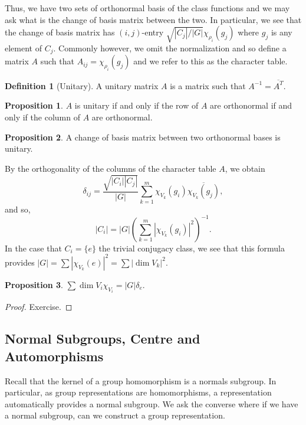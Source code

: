 \documentclass[]{article}
\theoremstyle{definition}
\theoremstyle{definition}
\newtheorem{definition}{Definition}[section]
\newtheorem{proposition}{Proposition}[section]
\begin{document}
Thus, we have two sets of orthonormal basis of the class functions and we may 
ask what is the change of basis matrix between the two. In particular, we 
see that the change of basis matrix has \((i, j)\)-entry 
\(\sqrt{|C_j| / |G|}\chi_{\rho_i}(g_j)\) where \(g_j\) is any element of 
\(C_j\). Commonly however, we omit the normalization and so define 
a matrix \(A\) such that \(A_{ij} = \chi_{\rho_i}(g_j)\) and we refer to this 
as the character table.

\begin{definition}[Unitary]
  A unitary matrix \(A\) is a matrix such that \(A^{-1} = \overline{A^T}\).
\end{definition}

\begin{proposition}
  \(A\) is unitary if and only if the row of \(A\) are orthonormal if and only 
  if the column of \(A\) are orthonormal.
\end{proposition}

\begin{proposition}
  A change of basis matrix between two orthonormal bases is unitary.
\end{proposition}

By the orthogonality of the columns of the character table \(A\), we obtain 
\[\delta_{ij} = \frac{\sqrt{|C_i||C_j|}}{|G|}\sum_{k = 1}^m 
  \chi_{V_k}(g_i)\overline{\chi_{V_k}(g_j)},\]
and so, 
\[|C_i| = |G| \left(\sum_{k = 1}^m |\chi_{V_k}(g_i)|^2\right)^{-1}.\]
In the case that \(C_i = \{e\}\) the trivial conjugacy class, we see that 
this formula provides \(|G| = \sum |\chi_{V_k}(e)|^2 = \sum |\dim V_k|^2\). 

\begin{proposition}
  \(\sum \dim V_i \chi_{V_i} = |G| \delta_{e}\).
\end{proposition}
\begin{proof}
  Exercise.
\end{proof}

\subsection{Normal Subgroups, Centre and Automorphisms}

Recall that the kernel of a group homomorphism is a normals subgroup. 
In particular, as group representations are homomorphisms, a representation 
automatically provides a normal subgroup. We ask the converse where if 
we have a normal subgroup, can we construct a group representation.
\end{document}

